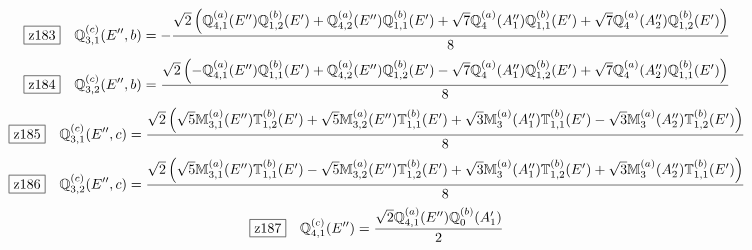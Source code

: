 \documentclass[fleqn,10pt,landscape]{jsarticle}
\begin{document}
\begin{dmath*}
\hspace*{3mm}\fbox{z183}\quad \mathbb{Q}_{3,1}^{(c)}(E^{\prime\prime},b)=- \frac{\sqrt{2} \left(\mathbb{Q}_{4,1}^{(a)}(E^{\prime\prime}) \mathbb{Q}_{1,2}^{(b)}(E^{\prime}) + \mathbb{Q}_{4,2}^{(a)}(E^{\prime\prime}) \mathbb{Q}_{1,1}^{(b)}(E^{\prime}) + \sqrt{7} \mathbb{Q}_{4}^{(a)}(A_{1}^{\prime\prime}) \mathbb{Q}_{1,1}^{(b)}(E^{\prime}) + \sqrt{7} \mathbb{Q}_{4}^{(a)}(A_{2}^{\prime\prime}) \mathbb{Q}_{1,2}^{(b)}(E^{\prime})\right)}{8}
\end{dmath*}
\begin{dmath*}
\hspace*{3mm}\fbox{z184}\quad \mathbb{Q}_{3,2}^{(c)}(E^{\prime\prime},b)=\frac{\sqrt{2} \left(- \mathbb{Q}_{4,1}^{(a)}(E^{\prime\prime}) \mathbb{Q}_{1,1}^{(b)}(E^{\prime}) + \mathbb{Q}_{4,2}^{(a)}(E^{\prime\prime}) \mathbb{Q}_{1,2}^{(b)}(E^{\prime}) - \sqrt{7} \mathbb{Q}_{4}^{(a)}(A_{1}^{\prime\prime}) \mathbb{Q}_{1,2}^{(b)}(E^{\prime}) + \sqrt{7} \mathbb{Q}_{4}^{(a)}(A_{2}^{\prime\prime}) \mathbb{Q}_{1,1}^{(b)}(E^{\prime})\right)}{8}
\end{dmath*}
\begin{dmath*}
\hspace*{3mm}\fbox{z185}\quad \mathbb{Q}_{3,1}^{(c)}(E^{\prime\prime},c)=\frac{\sqrt{2} \left(\sqrt{5} \mathbb{M}_{3,1}^{(a)}(E^{\prime\prime}) \mathbb{T}_{1,2}^{(b)}(E^{\prime}) + \sqrt{5} \mathbb{M}_{3,2}^{(a)}(E^{\prime\prime}) \mathbb{T}_{1,1}^{(b)}(E^{\prime}) + \sqrt{3} \mathbb{M}_{3}^{(a)}(A_{1}^{\prime\prime}) \mathbb{T}_{1,1}^{(b)}(E^{\prime}) - \sqrt{3} \mathbb{M}_{3}^{(a)}(A_{2}^{\prime\prime}) \mathbb{T}_{1,2}^{(b)}(E^{\prime})\right)}{8}
\end{dmath*}
\begin{dmath*}
\hspace*{3mm}\fbox{z186}\quad \mathbb{Q}_{3,2}^{(c)}(E^{\prime\prime},c)=\frac{\sqrt{2} \left(\sqrt{5} \mathbb{M}_{3,1}^{(a)}(E^{\prime\prime}) \mathbb{T}_{1,1}^{(b)}(E^{\prime}) - \sqrt{5} \mathbb{M}_{3,2}^{(a)}(E^{\prime\prime}) \mathbb{T}_{1,2}^{(b)}(E^{\prime}) + \sqrt{3} \mathbb{M}_{3}^{(a)}(A_{1}^{\prime\prime}) \mathbb{T}_{1,2}^{(b)}(E^{\prime}) + \sqrt{3} \mathbb{M}_{3}^{(a)}(A_{2}^{\prime\prime}) \mathbb{T}_{1,1}^{(b)}(E^{\prime})\right)}{8}
\end{dmath*}
\begin{dmath*}
\hspace*{3mm}\fbox{z187}\quad \mathbb{Q}_{4,1}^{(c)}(E^{\prime\prime})=\frac{\sqrt{2} \mathbb{Q}_{4,1}^{(a)}(E^{\prime\prime}) \mathbb{Q}_{0}^{(b)}(A_{1}^{\prime})}{2}
\end{dmath*}
\end{document}
